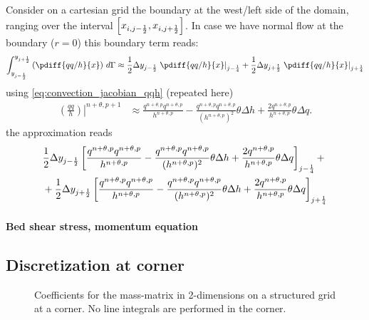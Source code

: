 Consider on a cartesian grid the boundary at the west/left side of the domain, ranging over the interval $\left[ x_{i, j-\frac{1}{2}}, x_{i, j+\frac{1}{2}} \right]$.
In case we have normal flow at the boundary ($r=0$) this boundary term reads:
\begin{align}
    \int^{y_{j+\half}}_{y_{j-\half}}\left(
    \pdiff{qq/h}{x}
    \right) \, d\Gamma \approx
    \half\Dy_{j-\half}\left.\pdiff{qq/h}{x}\right|_{j-\quart} + \half \Dy_{j+\half}\left.\pdiff{qq/h}{x}\right|_{j+\quart}
\end{align}
using \autoref{eq:convection_jacobian_qqh} (repeated here)
\begin{align}
    \left.\left(\frac{qq}{h}\right)\right|^{n+\theta, p+1} &  \approx
    \frac{q^{n+\theta, p}q^{n+\theta, p}}{h^{n+\theta, p}}
    - \frac{q^{n+\theta, p}q^{n+\theta, p}}{(h^{n+\theta, p})^2} \theta\Delta h
    + \frac{2 q^{n+\theta, p}}{h^{n+\theta, p}} \theta\Delta q.
\end{align}
the approximation reads
\begin{align}
    &\frac{1}{2}\Delta y_{j-\frac{1}{2}}\left[\frac{q^{n+\theta, p}q^{n+\theta, p}}{h^{n+\theta, p}}
    - \frac{q^{n+\theta, p}q^{n+\theta, p}}{(h^{n+\theta, p})^2} \theta\Delta h
    +
\frac{2 q^{n+\theta, p}}{h^{n+\theta, p}} \theta\Delta q \right]_{j-\frac{1}{4}} +
    \nonumber \\*
& +
    \frac{1}{2} \Delta y_{j+\frac{1}{2}}\left[\frac{q^{n+\theta, p}q^{n+\theta, p}}{h^{n+\theta, p}}
    - \frac{q^{n+\theta, p}q^{n+\theta, p}}{(h^{n+\theta, p})^2} \theta\Delta h
    +
    \frac{2 q^{n+\theta, p}}{h^{n+\theta, p}} \theta\Delta q \right]_{j+\frac{1}{4}}
\end{align}
\paragraph*{Bed shear stress, momentum equation}
\notyet
\subsection{Discretization at corner}
\begin{figure}[H]
    \begin{center}
        \def\svgwidth{0.8\textwidth} %
        \resizebox{0.65\textwidth}{!}{
            
        }
    \end{center}
    \caption{Coefficients for the mass-matrix in 2-dimensions on a structured grid at a corner. No line integrals are performed in the corner.}
    \label{fig:structured_grid_at_corner}
\end{figure}
